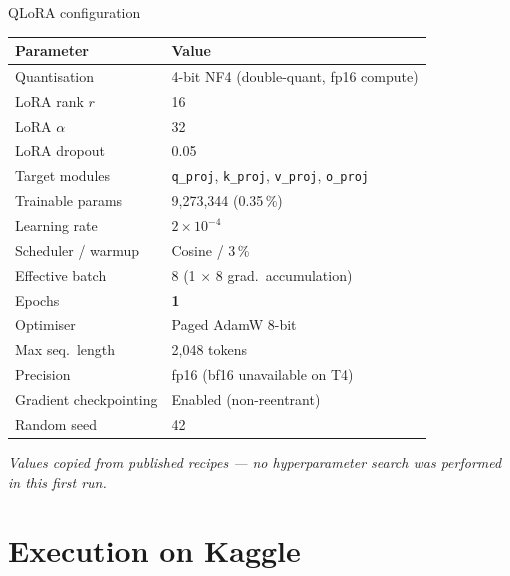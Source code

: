 \documentclass[aspectratio=169, 10pt]{beamer}
\begin{document}
\begin{frame}{QLoRA configuration}
  \centering\scriptsize
  \begin{tabular}{ll}
    \toprule
    \textbf{Parameter} & \textbf{Value} \\
    \midrule
    Quantisation          & 4-bit NF4 (double-quant, fp16 compute) \\
    LoRA rank $r$         & 16 \\
    LoRA $\alpha$         & 32 \\
    LoRA dropout          & 0.05 \\
    Target modules        & \texttt{q\_proj}, \texttt{k\_proj}, \texttt{v\_proj}, \texttt{o\_proj} \\
    Trainable params      & 9{,}273{,}344  (0.35\,\%) \\
    Learning rate         & $2 \times 10^{-4}$ \\
    Scheduler / warmup    & Cosine / 3\,\% \\
    Effective batch       & 8  (1 $\times$ 8 grad.\ accumulation) \\
    Epochs                & \textbf{1} \\
    Optimiser             & Paged AdamW 8-bit \\
    Max seq.\ length      & 2{,}048 tokens \\
    Precision             & fp16 (bf16 unavailable on T4) \\
    Gradient checkpointing& Enabled (non-reentrant) \\
    Random seed           & 42 \\
    \bottomrule
  \end{tabular}

  \vspace{0.5em}
  \begin{center}
    \scriptsize\color{sfaxblue}\itshape
    Values copied from published recipes --- no hyperparameter search was
    performed in this first run.
  \end{center}
\end{frame}

\section{Execution on Kaggle}
\end{document}
